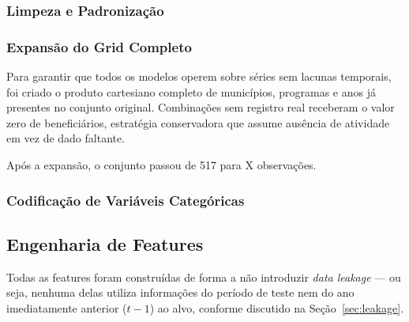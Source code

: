 \documentclass[12pt, a4paper]{article}
\begin{document}
\subsubsection{Limpeza e Padronização}


\subsubsection{Expansão do Grid Completo}
\label{sec:grid}

Para garantir que todos os modelos operem sobre séries sem lacunas temporais,
foi criado o produto cartesiano completo de municípios, programas e anos
já presentes no conjunto original. Combinações sem registro real receberam
o valor zero de beneficiários, estratégia conservadora que assume ausência
de atividade em vez de dado faltante.

Após a expansão, o conjunto passou de 517 para X observações.

\subsubsection{Codificação de Variáveis Categóricas}


\subsection{Engenharia de Features}
\label{sec:features}

Todas as features foram construídas de forma a não introduzir
\textit{data leakage} --- ou seja, nenhuma delas utiliza informações
do período de teste nem do ano imediatamente anterior ($t-1$) ao alvo,
conforme discutido na Seção~\ref{sec:leakage}.
\end{document}
